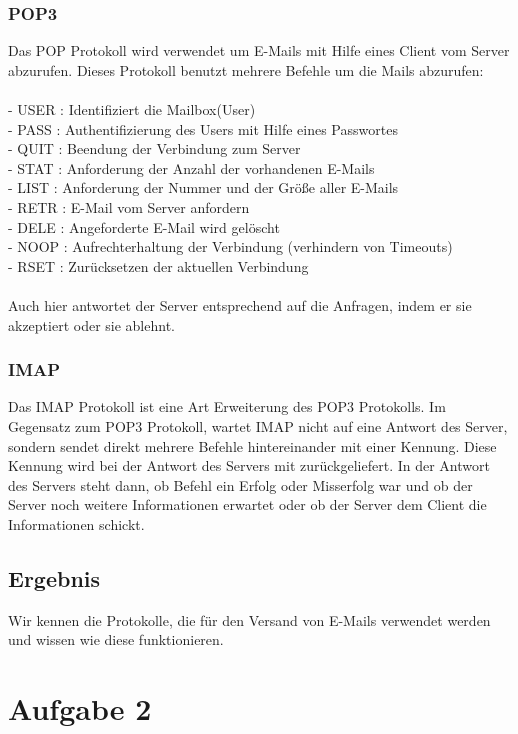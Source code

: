 \subsubsection{POP3} 
Das POP Protokoll wird verwendet um E-Mails mit Hilfe eines Client vom Server abzurufen. Dieses Protokoll benutzt mehrere Befehle um die Mails abzurufen: \\
\\
- USER : Identifiziert die Mailbox(User)\\
- PASS : Authentifizierung des Users mit Hilfe eines Passwortes\\
- QUIT :  Beendung der Verbindung zum Server\\
- STAT : Anforderung der Anzahl der vorhandenen E-Mails\\
- LIST : Anforderung der Nummer und der Größe aller E-Mails\\
- RETR : E-Mail vom Server anfordern\\
- DELE : Angeforderte E-Mail wird gelöscht\\
- NOOP : Aufrechterhaltung der Verbindung (verhindern von Timeouts)\\
- RSET : Zurücksetzen der aktuellen Verbindung\\
\\
Auch hier antwortet der Server entsprechend auf die Anfragen, indem er sie akzeptiert oder sie ablehnt. \cite{[2]}

\subsubsection{IMAP} 
Das IMAP Protokoll ist eine Art Erweiterung des POP3 Protokolls. Im Gegensatz zum POP3 Protokoll, wartet IMAP nicht auf eine Antwort des Server, sondern sendet direkt mehrere Befehle hintereinander mit einer Kennung. Diese Kennung wird bei der Antwort des Servers mit zurückgeliefert. In der Antwort des Servers steht dann, ob Befehl ein Erfolg oder Misserfolg war und ob der Server noch weitere Informationen erwartet oder ob der Server dem Client die Informationen schickt. \cite{[3]} 

\subsection{Ergebnis}
Wir kennen die Protokolle, die für den Versand von E-Mails verwendet werden und wissen wie diese funktionieren.

\section{Aufgabe 2}

